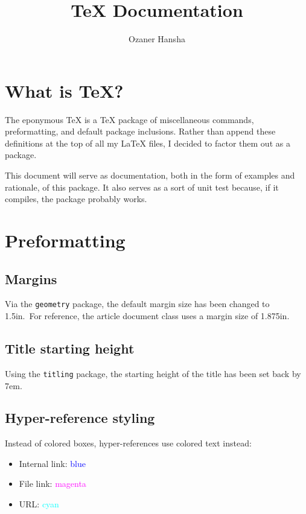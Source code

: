 \documentclass{article}
\begin{document}
\title{\Ozaner\TeX{} Documentation}
\author{Ozaner Hansha}
\date{}
\maketitle
\setcounter{section}{-1}

\section*{What is \Ozanerbf\TeX{}?}
The eponymous \Ozaner\TeX{} is a \TeX{} package of miscellaneous commands, preformatting, and default package inclusions. Rather than append these definitions at the top of all my \LaTeX{} files, I decided to factor them out as a package.

This document will serve as documentation, both in the form of examples and rationale, of this package. It also serves as a sort of unit test because, if it compiles, the package probably works.

\tableofcontents

\newpage{}

\section{Preformatting}
\subsection{Margins}
Via the \texttt{geometry} package, the default margin size has been changed to 1.5in.\ For reference, the article document class uses a margin size of 1.875in.

\subsection{Title starting height}
Using the \texttt{titling} package, the starting height of the title has been set back by 7em.

\subsection{Hyper-reference styling}
Instead of colored boxes, hyper-references use colored text instead:
\begin{itemize}
  \item Internal link: \textcolor{blue}{blue}
  \item File link: \textcolor{magenta}{magenta}
  \item URL: \textcolor{cyan}{cyan}
\end{itemize}
\end{document}

